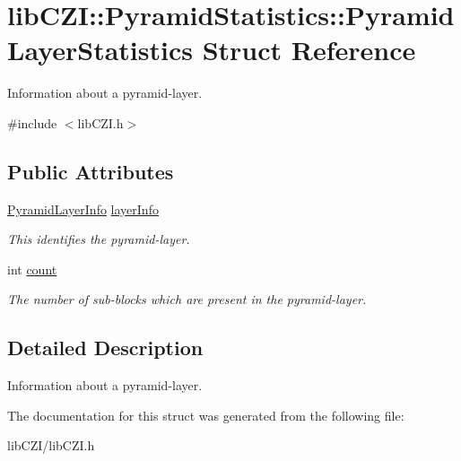 \hypertarget{structlib_c_z_i_1_1_pyramid_statistics_1_1_pyramid_layer_statistics}{}\section{lib\+C\+ZI\+:\+:Pyramid\+Statistics\+:\+:Pyramid\+Layer\+Statistics Struct Reference}
\label{structlib_c_z_i_1_1_pyramid_statistics_1_1_pyramid_layer_statistics}


Information about a pyramid-\/layer.  




{\ttfamily \#include $<$lib\+C\+Z\+I.\+h$>$}

\subsection*{Public Attributes}
\begin{DoxyCompactItemize}
\item 
\mbox{\label{structlib_c_z_i_1_1_pyramid_statistics_1_1_pyramid_layer_statistics_aebd2aa3ece769861674d89007717aa4a}} 
\hyperlink{structlib_c_z_i_1_1_pyramid_statistics_1_1_pyramid_layer_info}{Pyramid\+Layer\+Info} \hyperlink{structlib_c_z_i_1_1_pyramid_statistics_1_1_pyramid_layer_statistics_aebd2aa3ece769861674d89007717aa4a}{layer\+Info}
\begin{DoxyCompactList}\small\item\em This identifies the pyramid-\/layer. \end{DoxyCompactList}\item 
\mbox{\label{structlib_c_z_i_1_1_pyramid_statistics_1_1_pyramid_layer_statistics_a9622c14764217c603d3e50565c768702}} 
int \hyperlink{structlib_c_z_i_1_1_pyramid_statistics_1_1_pyramid_layer_statistics_a9622c14764217c603d3e50565c768702}{count}
\begin{DoxyCompactList}\small\item\em The number of sub-\/blocks which are present in the pyramid-\/layer. \end{DoxyCompactList}\end{DoxyCompactItemize}


\subsection{Detailed Description}
Information about a pyramid-\/layer. 

The documentation for this struct was generated from the following file\+:\begin{DoxyCompactItemize}
\item 
lib\+C\+Z\+I/lib\+C\+Z\+I.\+h\end{DoxyCompactItemize}
